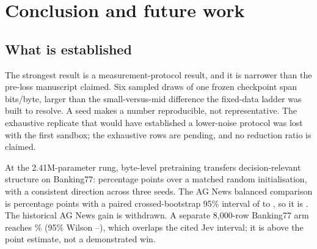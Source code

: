 \chapter{Conclusion and future work}
\label{ch:conclusion}

\section{What is established}

The strongest result is a measurement-protocol result, and it is narrower than the
pre-loss manuscript claimed. Six sampled draws of one frozen checkpoint span
\ProtoOldSpread{} bits/byte, larger than the small-versus-mid difference the
fixed-data ladder was built to resolve. A seed makes a number reproducible, not
representative. The exhaustive replicate that would have established a
lower-noise protocol was lost with the first sandbox; the exhaustive rows are
pending, and no reduction ratio is claimed.

At the 2.41M-parameter rung, byte-level pretraining transfers decision-relevant
structure on Banking77: \TransferBankGain{} percentage points over a matched random
initialisation, with a consistent direction across three seeds. The AG News
balanced comparison is \TransferAgGain{} percentage points with a paired
crossed-bootstrap 95\% interval of \TransferAgLo{} to \TransferAgHi{}, so it is
\TransferAgVerdict. The historical AG News gain is withdrawn. A separate
8,000-row Banking77 arm reaches \ShipAcc\% (95\% Wilson \ShipLo--\ShipHi), which
overlaps the cited Jev interval; it is above the point estimate, not a
demonstrated win.

